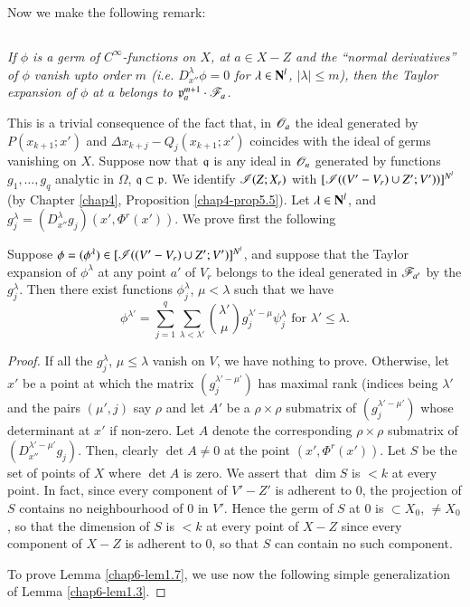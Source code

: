 Now we make the following remark:

\setcounter{subsection}{5}
\subsection{}\label{chap6-sec1.6}
{\em If $\phi$ is a germ of $C^{\infty}$-functions on $X$, at $a\in X-Z$ and the ``normal derivatives'' of $\phi$ vanish upto order $m$ (i.e. $D^{\lambda}_{x''}\phi=0$ for $\lambda\in \mathbf{N}^{l}$, $|\lambda|\leq m$), then the Taylor expansion of $\phi$ at a belongs to $\mathfrak{p}^{m+1}_{a}\cdot \mathscr{F}_{a}$.}

This is a trivial consequence of the fact that, in $\mathscr{O}_{a}$ the ideal generated by $P(x_{k+1};x')$ and $\Delta x_{k+j}-Q_{j}(x_{k+1};x')$ coincides with the ideal of germs vanishing on $X$. Suppose now that $\mathfrak{q}$ is any ideal in $\mathscr{O}_{n}$ generated by functions $g_{1},\ldots,g_{q}$ analytic in $\Omega$, $\mathfrak{q}\subset \mathfrak{p}$. We identify $\mathscr{I}(Z;X_{r})$ with $[\mathscr{I}((V'-V_{r})\cup Z';V'))]^{N^{l}}$ (by Chapter \ref{chap4}, Proposition \ref{chap4-prop5.5}). Let $\lambda\in \mathbf{N}^{l}$, and $g^{\lambda}_{j}=(D^{\lambda}_{x''}g_{j})(x',\Phi^{r}(x'))$. We prove first the following

\setcounter{theorem}{6}
\begin{lemma}\label{chap6-lem1.7}
Suppose $\phi=(\phi^{\lambda})\in[\mathscr{I}((V'-V_{r})\cup Z';V')]^{N^{l}}$, and suppose that the Taylor expansion of $\phi^{\lambda}$ at any point $a'$ of $V_{r}$ belongs to the ideal generated in $\mathscr{F}_{a'}$ by the $g^{\lambda}_{j}$. Then there exist functions $\phi^{\lambda}_{j}$, $\mu<\lambda$ such that we have
$$
\phi^{\lambda'}=\sum\limits^{q}_{j=1}\sum\limits_{\lambda<\lambda'}\binom{\lambda'}{\mu}g^{\lambda'-\mu}_{j}\psi^{\lambda}_{j}\text{ for } \lambda'\leq \lambda.
$$
\end{lemma}

\begin{proof}
If all the $g^{\lambda}_{j}$, $\mu\leq \lambda$ vanish on $V$, we have nothing to prove. Otherwise, let $x'$ be a point at which the matrix $(g^{\lambda'-\mu'}_{j})$ has maximal rank (indices being $\lambda'$ and the pairs $(\mu',j)$ say $\rho$ and let $A'$ be a $\rho\times \rho$ submatrix of $(g^{\lambda'-\mu'}_{j})$ whose determinant at $x'$ if non-zero. Let $A$ denote the corresponding $\rho\times\rho$ submatrix of $(D^{\lambda'-\mu'}_{x''}g_{j})$. Then, clearly $\det A\neq 0$ at the point $(x',\Phi^{r}(x'))$. Let $S$ be the set of points of $X$ where $\det A$ is zero. We assert that $\dim S$ is $< k$ at every point. In fact, since every component of $V'-Z'$ is adherent to $0$, the projection of $S$ contains no neighbourhood of $0$ in $V'$. Hence the germ of $S$ at $0$ is $\subset X_{0}$, $\neq X_{0}$, so that the dimension of $S$ is $<k$ at every point of $X-Z$ since every component of $X-Z$ is adherent to $0$, so that $S$ can contain no such component.

To prove Lemma \ref{chap6-lem1.7}, we use now the following simple generalization of Lemma \ref{chap6-lem1.3}.
\end{proof}

